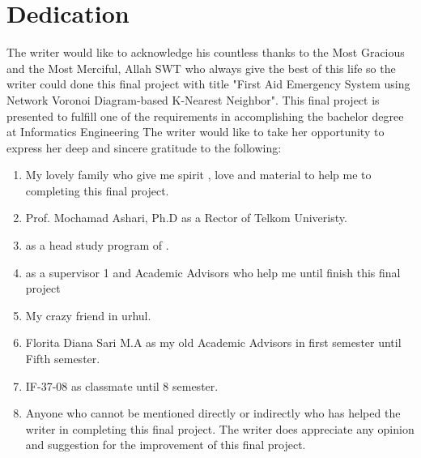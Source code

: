 \chapter*{Dedication}

The writer would like to acknowledge his countless thanks to the Most Gracious and the Most Merciful, Allah SWT who always give the best of this life so the writer could done this final project with title "First Aid Emergency System using Network Voronoi Diagram-based K-Nearest Neighbor". This final project is presented to fulfill one of the requirements in accomplishing the bachelor degree at Informatics Engineering  The writer would like to take her opportunity to express her deep and sincere gratitude to the following:
  \begin{enumerate}
      \item My lovely family who give me spirit , love and material to help me to completing this final project.
      \item Prof. Mochamad Ashari, Ph.D as a Rector of Telkom Univeristy.
      \item \Kaprodi as a head study program of \Prodi.
      \item \PembimbingSatu as a supervisor 1 and Academic Advisors who help me until finish this final project
      \item My crazy friend in urhul.
      \item Florita Diana Sari M.A as my old Academic Advisors in first semester until Fifth semester.
      \item IF-37-08 as classmate until 8 semester.
      \item Anyone who cannot be mentioned directly or indirectly who has helped the writer in completing this final project. The writer does appreciate any opinion and suggestion for the improvement of this final project.
  \end{enumerate}